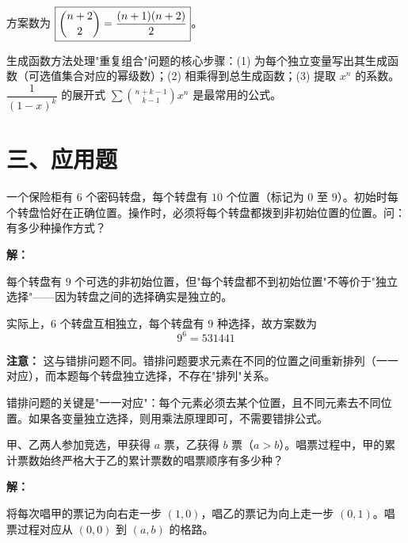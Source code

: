 \documentclass[12pt, a4paper]{ctexart}
\begin{document}
方案数为 \(\boxed{\dbinom{n+2}{2} = \dfrac{(n+1)(n+2)}{2}}\)。

\begin{tipbox}[方法总结]
生成函数方法处理"重复组合"问题的核心步骤：(1) 为每个独立变量写出其生成函数（可选值集合对应的幂级数）；(2) 相乘得到总生成函数；(3) 提取 \(x^n\) 的系数。\(\dfrac{1}{(1-x)^k}\) 的展开式 \(\displaystyle\sum \binom{n+k-1}{k-1}x^n\) 是最常用的公式。
\end{tipbox}

\section*{\textcolor{apppurple}{三、应用题}}

\begin{appbox}[【应用1】密码学中的错排]
一个保险柜有 \(6\) 个密码转盘，每个转盘有 \(10\) 个位置（标记为 \(0\) 至 \(9\)）。初始时每个转盘恰好在正确位置。操作时，必须将每个转盘都拨到非初始位置的位置。问：有多少种操作方式？
\end{appbox}

\textbf{解：}

每个转盘有 \(9\) 个可选的非初始位置，但"每个转盘都不到初始位置"不等价于"独立选择"——因为转盘之间的选择确实是独立的。

实际上，\(6\) 个转盘互相独立，每个转盘有 \(9\) 种选择，故方案数为
\[
9^6 = \boxed{531441}
\]

\textbf{注意：} 这与错排问题不同。错排问题要求元素在不同的位置之间重新排列（一一对应），而本题每个转盘独立选择，不存在"排列"关系。

\begin{warnbox}[易错提醒]
错排问题的关键是"一一对应"：每个元素必须去某个位置，且不同元素去不同位置。如果各变量独立选择，则用乘法原理即可，不需要错排公式。
\end{warnbox}

\vspace{6pt}

\begin{appbox}
甲、乙两人参加竞选，甲获得 \(a\) 票，乙获得 \(b\) 票（\(a > b\)）。唱票过程中，甲的累计票数始终严格大于乙的累计票数的唱票顺序有多少种？
\end{appbox}

\textbf{解：}

将每次唱甲的票记为向右走一步 \((1,0)\)，唱乙的票记为向上走一步 \((0,1)\)。唱票过程对应从 \((0,0)\) 到 \((a,b)\) 的格路。
\end{document}
